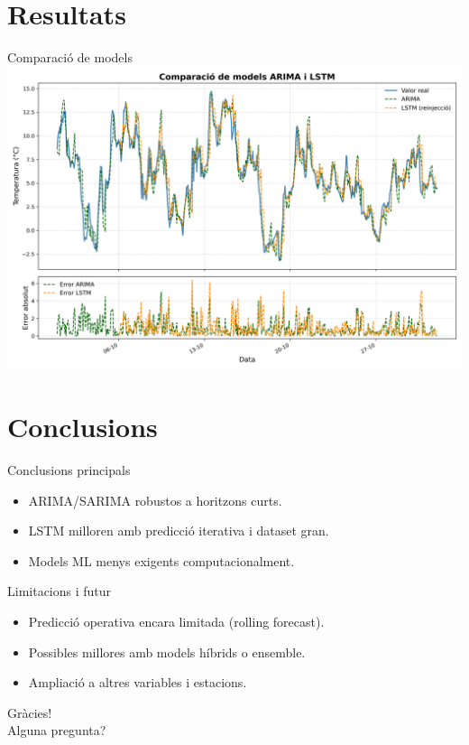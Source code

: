 \documentclass[mathserif, aspectratio=169]{beamer}
\begin{document}
\section{Resultats}

\begin{frame}{Comparació de models}
  \includegraphics[width=0.95\linewidth]{figures/comp_arima_lstm/comparacio_models_amb_errors.png}
\end{frame}

\section{Conclusions}

\begin{frame}{Conclusions principals}
  \begin{itemize}
    \item ARIMA/SARIMA robustos a horitzons curts.
    \item LSTM milloren amb predicció iterativa i dataset gran.
    \item Models ML menys exigents computacionalment.
  \end{itemize}
\end{frame}

\begin{frame}{Limitacions i futur}
  \begin{itemize}
    \item Predicció operativa encara limitada (rolling forecast).
    \item Possibles millores amb models híbrids o ensemble.
    \item Ampliació a altres variables i estacions.
  \end{itemize}
\end{frame}

\begin{frame}[standout]
  Gràcies! \\
  \small Alguna pregunta?
\end{frame}
\end{document}
